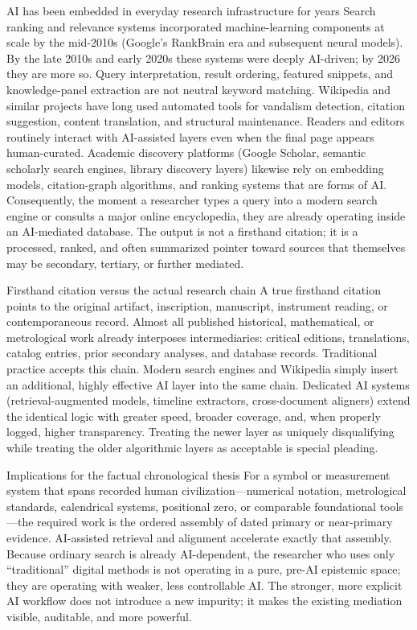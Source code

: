 AI has been embedded in everyday research infrastructure for years
Search ranking and relevance systems incorporated machine-learning components at scale by the mid-2010s (Google’s RankBrain era and subsequent neural models). By the late 2010s and early 2020s these systems were deeply AI-driven; by 2026 they are more so. Query interpretation, result ordering, featured snippets, and knowledge-panel extraction are not neutral keyword matching.
Wikipedia and similar projects have long used automated tools for vandalism detection, citation suggestion, content translation, and structural maintenance. Readers and editors routinely interact with AI-assisted layers even when the final page appears human-curated.
Academic discovery platforms (Google Scholar, semantic scholarly search engines, library discovery layers) likewise rely on embedding models, citation-graph algorithms, and ranking systems that are forms of AI.
Consequently, the moment a researcher types a query into a modern search engine or consults a major online encyclopedia, they are already operating inside an AI-mediated database. The output is not a firsthand citation; it is a processed, ranked, and often summarized pointer toward sources that themselves may be secondary, tertiary, or further mediated.

Firsthand citation versus the actual research chain
A true firsthand citation points to the original artifact, inscription, manuscript, instrument reading, or contemporaneous record. Almost all published historical, mathematical, or metrological work already interposes intermediaries: critical editions, translations, catalog entries, prior secondary analyses, and database records. Traditional practice accepts this chain. Modern search engines and Wikipedia simply insert an additional, highly effective AI layer into the same chain. Dedicated AI systems (retrieval-augmented models, timeline extractors, cross-document aligners) extend the identical logic with greater speed, broader coverage, and, when properly logged, higher transparency. Treating the newer layer as uniquely disqualifying while treating the older algorithmic layers as acceptable is special pleading.

Implications for the factual chronological thesis
For a symbol or measurement system that spans recorded human civilization—numerical notation, metrological standards, calendrical systems, positional zero, or comparable foundational tools—the required work is the ordered assembly of dated primary or near-primary evidence. AI-assisted retrieval and alignment accelerate exactly that assembly. Because ordinary search is already AI-dependent, the researcher who uses only “traditional” digital methods is not operating in a pure, pre-AI epistemic space; they are operating with weaker, less controllable AI. The stronger, more explicit AI workflow does not introduce a new impurity; it makes the existing mediation visible, auditable, and more powerful.


